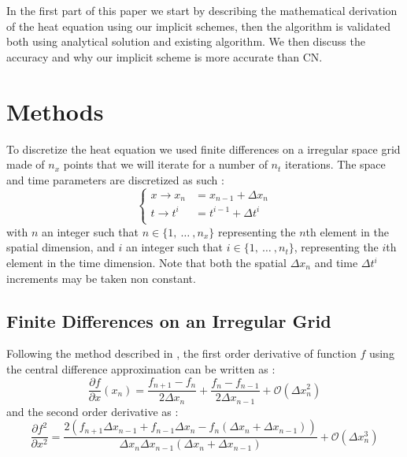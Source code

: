 \documentclass[]{interact}
\theoremstyle{plain}%
\theoremstyle{definition}
\theoremstyle{remark}
\begin{document}
In the first part of this paper we start by describing the mathematical derivation of the heat equation using our implicit schemes, then the algorithm is validated both using analytical solution and existing algorithm. We then discuss the accuracy and why our implicit scheme is more accurate than CN.

\section{Methods}


To discretize the heat equation we used finite differences on a irregular space grid made of $n_x$ points that we will iterate for a number of $n_t$ iterations. 
The space and time parameters are discretized as such :
\begin{equation}
\begin{cases}
    x \rightarrow x_n &= x_{n-1} + \Delta x_n \\
    t \rightarrow t^i &= t^{i-1} + \Delta t^i \\
    
\end{cases}
\end{equation}
with $n$ an integer such that $n \in  \{1, \: \dotsc \: , n_x\} $ representing the $n$th element in the spatial dimension, and $i$ an integer such that $i \in  \{1, \: \dotsc \: , n_t\} $, representing the $i$th element in the time dimension.
Note that both the spatial $\Delta x_n$ and time $\Delta t^i$ increments  may be taken non constant.

\subsection{Finite Differences on an Irregular Grid}

Following the method described in \cite{Sundqvist1970}, the first order derivative of function $f$ using the central difference approximation can be written as :
\begin{equation}
\frac{\partial f}{\partial x} (x_n) = \frac{f_{n+1}- f_{n}}{2 \Delta x_n} + \frac{f_{n}- f_{n-1}}{2 \Delta x_{n-1}} + \mathcal{O}(\Delta x_n^2)
 \label{eq:1_deriv}
\end{equation}
and the second order derivative as :
\begin{equation}
	\frac{\partial f^2}{\partial x^2} = \dfrac{2 \left( f_{n+1} \Delta x_{n-1} + f_{n-1} \Delta x_{n} - f_n \left( \Delta x_{n} + \Delta x_{n-1}\right) \right) }{\Delta x_{n} \Delta x_{n-1} \left( \Delta x_{n} + \Delta x_{n-1}\right)} + \mathcal{O}(\Delta x_n^3)
 \label{eq:2_deriv}
\end{equation}
\end{document}
